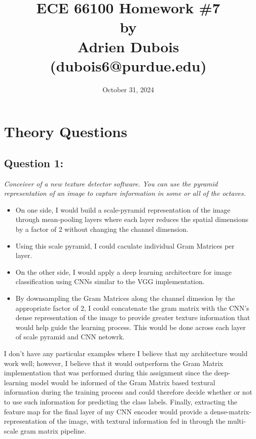 \documentclass{article}
\date{October 31, 2024}
\title{\Large \textbf{ECE 66100 Homework \#7\\[0.1in] by\\ [0.1in] Adrien Dubois (dubois6@purdue.edu)}}
\begin{document}
\maketitle
\tableofcontents

\section{Theory Questions}
\subsection{Question 1:}
\textit{Conceiver of a new texture detector software. You can use the pyramid representation of an image to capture information in some or all of the octaves.}

\begin{itemize}
    \item On one side, I would build a scale-pyramid representation of the image through mean-pooling layers where each layer reduces the spatial dimensions by a factor of 2 without changing the channel dimension.
    \item Using this scale pyramid, I could caculate individual Gram Matrices per layer.
    \item On the other side, I would apply a deep learning architecture for image classification using CNNs similar to the VGG implementation.
    \item By downsampling the Gram Matrices along the channel dimesion by the appropriate factor of 2, I could concatenate the gram matrix with the CNN's dense representation of the image to provide greater texture information that would help guide the learning process. This would be done across each layer of scale pyramid and CNN netowrk.
\end{itemize}
I don't have any particular examples where I believe that my architecture would work well; however, I believe that it would outperform the Gram Matrix implementation that was performed during this assignment since the deep-learning model would be informed of the Gram Matrix based textural information during the training process and could therefore decide whether or not to use such information for predicting the class labels. Finally, extracting the feature map for the final layer of my CNN encoder would provide a dense-matrix-representation of the image, with textural information fed in through the multi-scale gram matrix pipeline. 
\end{document}
